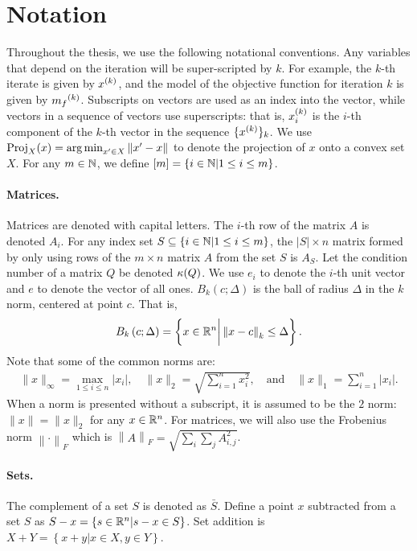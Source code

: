 \documentclass{article}
\begin{document}
\section{Notation}
Throughout the thesis, we use the following notational conventions.
Any variables that depend on the iteration will be super-scripted by $k$.
For example, the $k$-th iterate is given by $x^{(k)}$,
and the model of the objective function for iteration $k$ is given by ${{m}_f}^{(k)}$.
Subscripts on vectors are used as an index into the vector, while vectors in a sequence of vectors use superscripts:
that is, $x_i^{(k)}$ is the $i$-th component of the $k$-th vector in the sequence $\{x^{(k)}\}_k$.
We use ${\textrm{Proj}}_X(x) = \operatorname*{arg\,min}_{x' \in X}\left\|x' - x\right\|$ to denote the projection of $x$ onto a convex set $X$.
For any $m \in \mathbb N$, we define $[m] = \left\{i \in \mathbb N | 1 \le i \le m\right\}$.

\paragraph*{Matrices.}
Matrices are denoted with capital letters.
The $i$-th row of the matrix $A$ is denoted $A_i$.
For any index set $S \subseteq \{i \in \mathbb N | 1 \le i \le m\}$, the $|S| \times n$ matrix formed by only using
rows of the $m\times n$ matrix $A$ from the set $S$ is $A_S$.
Let the condition number of a matrix $Q$ be denoted ${\kappa}(Q)$.
We use $e_i$ to denote the $i$-th unit vector and $e$ to denote the vector of all ones.
$B_k\left(c; \Delta\right)$ is the ball of radius $\Delta$ in the $k$ norm, centered at point $c$.  That is,
\begin{align}
\label{define_ball}
B_k\left(c; \Delta\right) = \left\{x \in \mathbb R^n \bigg | \left\|x - c\right\|_k \le \Delta \right\}.
\end{align}
Note that some of the common norms are:
\begin{align*}
\|x\|_{\infty} = \max_{1\le i\le n}|x_i|, \quad
\|x\|_{2} = \sqrt{\sum_{i=1}^n x_i^2}, \quad \textrm{and} \quad
\|x\|_1 = \sum_{i = 1}^n |x_i|.
\end{align*}
When a norm is presented without a subscript, it is assumed to be the $2$ norm: $\|x\| = \|x\|_2$ for any $x \in \mathbb R^n$.
For matrices, we will also use the Frobenius norm $\left\|\cdot\right\|_F$ which is $\left\|A\right\|_F = \sqrt{\sum_i\sum_jA_{i, j}^2}$.

\paragraph*{Sets.}
The complement of a set $S$ is denoted as $\bar S$.
Define a point $x$ subtracted from a set $S$ as $S - x = \left\{s \in \mathbb R^n | s - x \in S\right\}$.
Set addition is $X + Y = \left\{x + y | x \in X, y \in Y\right\}$.
\end{document}
